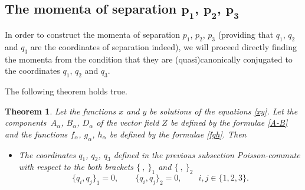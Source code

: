 \documentclass[pdftex]{sigma}
\def\a{\alpha}
\numberwithin{equation}{section}
\newtheorem{Theorem}{Theorem}[section]
\begin{document}
\subsection[The momenta of separation p\_1, p\_2, p\_3]{The momenta of separation $\boldsymbol{p_1}$, $\boldsymbol{p_2}$, $\boldsymbol{p_3}$}
In order to construct the momenta of separation $p_1$, $p_2$, $p_3$ (providing that $q_1$, $q_2$ and $q_3$ are the coordinates of separation indeed), we will proceed directly finding the momenta from the condition that they are (quasi)canonically conjugated to the coordinates $q_1$, $q_2$ and $q_3$.

The following theorem holds true.
\begin{Theorem}\label{momenti}
Let the functions $x$ and $y$ be solutions of the equations \eqref{xy}. Let the components~$A_{\a}$, $B_{\a}$, $D_{\a}$ of the vector field $Z$ be defined by the formulae \eqref{A-B} and the functions $f_{\a}$, $g_{\a}$, $h_{\a}$ be defined by the formulae \eqref{fgh}. Then
\begin{itemize}\itemsep=0pt
\item[$(i)$] The coordinates $q_1$, $q_2$, $q_3$ defined in the previous subsection Poisson-commute with respect to the both brackets $ \{\ ,\ \}_1$ and $\{\ , \ \}_2$
\begin{equation}\label{qcanon}
\{q_i,q_j\}_1=0, \qquad
\{q_i,q_j\}_2=0, \qquad i, j\in \{1,2,3\}.
\end{equation}


\end{itemize}
\end{Theorem}
\end{document}
